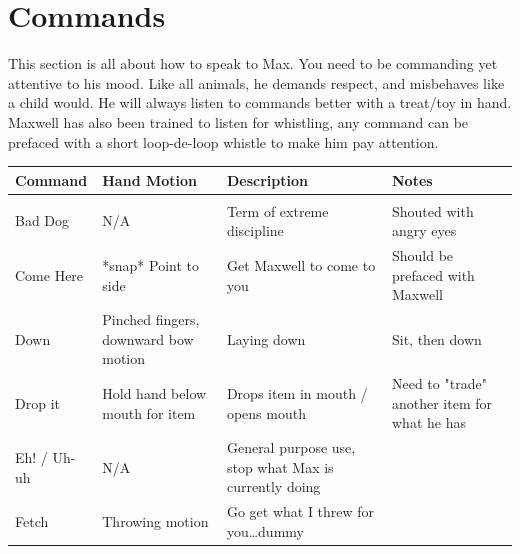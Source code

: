 \documentclass[pdftex,12pt]{article}
\begin{document}
\newpage
\section{Commands}

This section is all about how to speak to Max. You need to be commanding yet
attentive to his mood. Like all animals, he demands respect, and misbehaves like
a child would. He will always listen to commands better with a treat/toy in
hand. Maxwell has also been trained to listen for whistling, any command can be
prefaced with a short loop-de-loop whistle to make him pay attention.

\begin{table}[H]
\label{tab:commands}
\begin{adjustwidth}{-4.5cm}{-4.5cm}
\begin{center}
    \begin{tabular}{lp{}p{}p{}}
        Command     & Hand Motion                                      &
        Description                                           & Notes
        \\ \hline \\
        Bad Dog     & N/A                                              & Term of extreme discipline                            & Shouted with angry eyes                                            \\
        Come Here   & *snap* Point to side                             & Get Maxwell to come to you                            & Should be prefaced with Maxwell                                    \\
        Down        & Pinched fingers, downward bow motion             & Laying down                                           & Sit, then down                                                     \\
        Drop it     & Hold hand below mouth for item                   & Drops item in mouth / opens mouth                     & Need to "trade" another item for what he has                       \\
        Eh! / Uh-uh & N/A                                              & General purpose use, stop what Max is currently doing &                                                                    \\
        Fetch       & Throwing motion                                  & Go get
        what I threw for you\ldots dummy                   &                                                                    \\

\end{tabular}
\end{center}
\end{adjustwidth}
\end{table}
\end{document}
